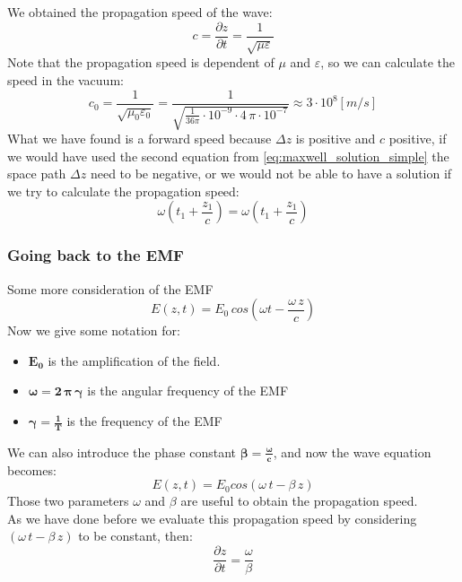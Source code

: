 We obtained the propagation speed of the wave:
\begin{equation}
    c=\frac{\partial z}{\partial t}=\frac{1}{\sqrt{\mu \varepsilon}}
\end{equation}
Note that the propagation speed is dependent of $\mu$ and $\varepsilon$, so we can calculate the speed in the vacuum:
\begin{equation}
    c_0=\frac{1}{\sqrt{\mu_0 \varepsilon_0}}=\frac{1}{\sqrt{\frac{1}{36\pi}\cdot 10^{-9}\cdot 4\,\pi\cdot 10^{-7}}}\approx 3\cdot 10^{8}[m/s]
\end{equation}
What we have found is a forward speed because $\Delta z$ is positive and $c$ positive, if we would have used the second equation from \cref{eq:maxwell_solution_simple} the space path $\Delta z$ need to be negative, or we would not be able to have a solution if we try to calculate the propagation speed:
\begin{equation}
    \omega\left(t_1+\frac{z_1}{c}\right)=\omega\left(t_1+\frac{z_1}{c}\right)
\end{equation}
\subsubsection*{Going back to the EMF}
Some more consideration of the EMF
\begin{equation}
    E(z,t)=E_0\,cos(\omega t-\frac{\omega\,z}{c})
\end{equation}
Now we give some notation for:
\begin{itemize}
    \item $\bm{E_0}$ is the amplification of the field.
    \item $\bm{\omega=2\,\pi\,\gamma} $ is the angular frequency of the EMF
    \item $\bm{\gamma=\frac{1}{T}}$ is the frequency of the EMF
\end{itemize}
We can also introduce the phase constant $\bm{\beta=\frac{\omega}{c}}$, and now the wave equation becomes:
\begin{equation}\label{eq:E_with_phase_constant}
    E(z,t)=E_0cos(\omega\, t-\beta\,z)
\end{equation}
Those two parameters $\omega$ and $\beta$ are useful to obtain the propagation speed.\\
As we have done before we evaluate this propagation speed by considering $(\omega \,t-\beta \,z)$ to be constant, then:
\begin{equation}
    \frac{\partial z}{\partial t}=\frac{\omega}{\beta}
\end{equation}
